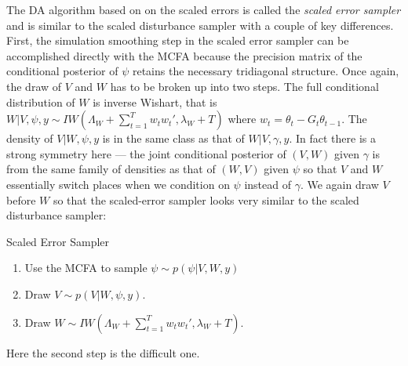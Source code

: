 \documentclass{article}
\begin{document}
The DA algorithm based on on the scaled errors is called the {\it scaled error sampler} and is similar to the scaled disturbance sampler with a couple of key differences. First, the simulation smoothing step in the scaled error sampler can be accomplished directly with the MCFA because the precision matrix of the conditional posterior of $\psi$ retains the necessary tridiagonal structure. Once again, the draw of $V$ and $W$ has to be broken up into two steps. The full conditional distribution of $W$ is inverse Wishart, that is $W|V,\psi,y \sim IW\left(\Lambda_W + \sum_{t=1}^Tw_tw_t',\lambda_{W} + T\right)$ where $w_t = \theta_t - G_t\theta_{t-1}$. The density of $V|W,\psi,y$ is in the same class as that of $W|V,\gamma,y$. In fact there is a strong symmetry here --- the joint conditional posterior of $(V,W)$ given $\gamma$ is from the same family of densities as that of $(W,V)$ given $\psi$ so that $V$ and $W$ essentially switch places when we condition on $\psi$ instead of $\gamma$. We again draw $V$ before $W$ so that the scaled-error sampler looks very similar to the scaled disturbance sampler: 
\begin{alg*}[SE]Scaled Error Sampler\label{alg:DLMerror}
\begin{enumerate}
\item Use the MCFA to sample $\psi \sim  p(\psi|V,W,y)$
\item Draw $V \sim p(V|W,\psi,y)$.
\item Draw $W \sim IW\left(\Lambda_W + \sum_{t=1}^Tw_tw_t',\lambda_{W} + T\right)$.
\end{enumerate}
\end{alg*}\noindent
Here the second step is the difficult one.
\end{document}

